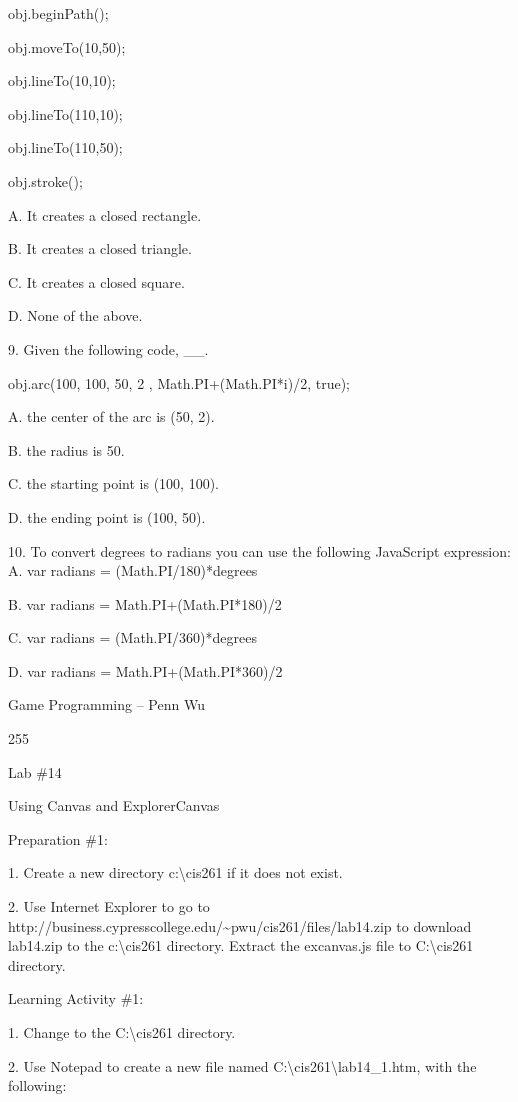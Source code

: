 \documentclass[
]{article}
\begin{document}
obj.beginPath();

obj.moveTo(10,50);

obj.lineTo(10,10);

obj.lineTo(110,10);

obj.lineTo(110,50);

obj.stroke();

A. It creates a closed rectangle.

B. It creates a closed triangle.

C. It creates a closed square.

D. None of the above.

9. Given the following code, \_\_.

obj.arc(100, 100, 50, 2 , Math.PI+(Math.PI*i)/2, true);

A. the center of the arc is (50, 2).

B. the radius is 50.

C. the starting point is (100, 100).

D. the ending point is (100, 50).

10. To convert degrees to radians you can use the following JavaScript
expression: A. var radians = (Math.PI/180)*degrees

B. var radians = Math.PI+(Math.PI*180)/2

C. var radians = (Math.PI/360)*degrees

D. var radians = Math.PI+(Math.PI*360)/2

Game Programming -- Penn Wu

255

\protect\hypertarget{index_split_013.htmlux5cux23p256}{}{}

Lab \#14

Using Canvas and ExplorerCanvas

Preparation \#1:

1. Create a new directory c:\textbackslash cis261 if it does not exist.

2. Use Internet Explorer to go to
http://business.cypresscollege.edu/\textasciitilde pwu/cis261/files/lab14.zip
to download lab14.zip to the c:\textbackslash cis261 directory. Extract
the excanvas.js file to C:\textbackslash cis261 directory.

Learning Activity \#1:

1. Change to the C:\textbackslash cis261 directory.

2. Use Notepad to create a new file named
C:\textbackslash cis261\textbackslash lab14\_1.htm, with the following:
\end{document}
